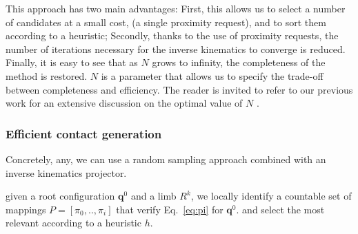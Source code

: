 This approach has two main advantages:
First, this allows us to select a number of candidates at a small cost, (a single proximity request), and to sort them according to a heuristic;
Secondly, thanks to the use of proximity requests, the number of iterations necessary for the inverse kinematics to converge is reduced.
Finally, it is easy to see that as $N$ grows to infinity, the completeness of the method is restored.
$N$ is a parameter that allows us to specify the trade-off between completeness and efficiency.
The reader is invited to refer to our previous work for an extensive discussion on the optimal value of $N$ \citep{Tonneau2014}.


\subsubsection{Efficient contact generation }

Concretely, any, we can use a random sampling approach combined with an inverse kinematics projector.   

given a root configuration $\mathbf{q}^0$ and a limb $R^k$, we locally identify a countable set of mappings $P = [\pi_0,..,\pi_i] $ that verify Eq.~\eqref{eq:pi} for $\mathbf{q}^0$. and select the most relevant according to a heuristic $h$.



